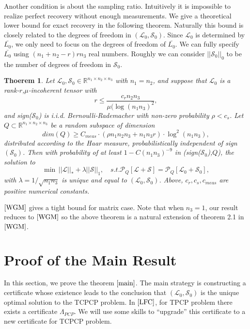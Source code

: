 \documentclass[journal,transmag]{IEEEtran}
\newtheorem{theorem}{Thoerem}[section]
\theoremstyle{plain}
\begin{document}
Another condition is about the sampling ratio. Intuitively it is impossible to realize perfect recovery without enough measurements. We give a theoretical lower bound for exact recovery in the following theorem. Naturally this bound is closely related to the degrees of freedom in $(\mathcal{L}_0, \mathcal{S}_0)$. Since $\mathcal{L}_0$ is determined by $\bar{L_0}$, we only need to focus on the degrees of freedom of $\bar{L_0}$. We can fully specify $\bar{L_0}$ using $(n_1+n_2-r)rn_3$ real numbers. Roughly we can consider $||\mathcal{S}_0||_0$ to be the number of degrees of freedom in $\mathcal{S}_0$.
\begin{theorem} \label{main}
Let $\mathcal{L}_0,\mathcal{S}_0\in \mathbb{R}^{n_1\times n_2 \times n_3}$ with $n_1=n_2$, and suppose that $\mathcal{L}_0$ is a rank-$r$,$\mu$-incoherent tensor with
\begin{equation}
r\le \frac{c_r n_2 n_3}{\mu (\log(n_1 n_3)^2},
\end{equation}
and sign($\mathcal{S}_0$) is i.i.d. Bernoulli-Rademacher with non-zero probability $\rho<c_{s}$. Let $Q \subset \mathbb{R}^{n_1 \times n_2 \times n_3}$ be a random subspace of dimension
\begin{equation}
dim(Q)\ge C_{meas}\cdot (\rho n_1 n_2 n_3 + n_1 n_3 r)\cdot  \log^2 (n_1 n_3),
\end{equation}
distributed according to the Haar measure, probabilistically independent of sign$(\mathcal{S}_0)$. Then with probability of at least $1-C(n_1 n_3)^{-9}$ in (sign($\mathcal{S}_0$),$Q$), the solution to
\begin{equation}\label{solutionEq}
\min \, ||\mathcal{L}||_{*}+\lambda||\mathcal{S}||_1, \quad s.t.\mathcal{P}_Q[\mathcal{L+S}]=\mathcal{P}_Q[\mathcal{L}_0+\mathcal{S}_0],
\end{equation}
with $\lambda = 1/\sqrt{n_1 n_3}$ is unique and equal to $(\mathcal{L}_0,\mathcal{S}_0)$. Above, $c_r,c_s,c_{meas}$ are positive numerical constants.
\end{theorem}
$\cite{WGM}$ gives a tight bound for matrix case. Note that when $n_3=1$, our result reduces to $\cite{WGM}$ so the above theorem is a natural extension of theorem 2.1 in $\cite{WGM}$.

\section{Proof of the Main Result}
In this section, we prove the theorem $\ref{main}$. The main strategy is constructing a certificate whose existence leads to the conclusion that $(\mathcal{L}_0,\mathcal{S}_0)$ is the unique optimal solution to the TCPCP problem. In $\cite{LFC}$, for TPCP problem there exists a certificate $\Lambda_{PCP}$. We will use some skills to ``upgrade'' this certificate to a new certificate for TCPCP problem.
\end{document}
